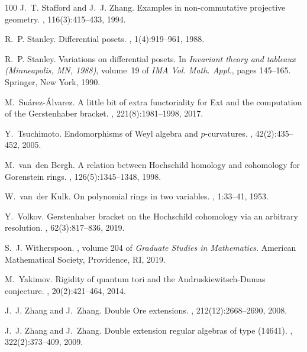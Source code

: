 \documentclass{commat}
\begin{document}
\begin{thebibliography}{100}
J.~T. Stafford and J.~J. Zhang.
\newblock Examples in non-commutative projective geometry.
, 116(3):415--433, 1994.

R.~P. Stanley.
\newblock Differential posets.
, 1(4):919--961, 1988.

R.~P. Stanley.
\newblock Variations on differential posets.
\newblock In {\em Invariant theory and tableaux ({M}inneapolis, {MN}, 1988)},
  volume~19 of {\em IMA Vol. Math. Appl.}, pages 145--165. Springer, New York,
  1990.

M.~Su\'arez-\'Alvarez.
\newblock A little bit of extra functoriality for {E}xt and the computation of
  the {G}erstenhaber bracket.
, 221(8):1981--1998, 2017.

Y.~Tsuchimoto.
\newblock Endomorphisms of {W}eyl algebra and {$p$}-curvatures.
, 42(2):435--452, 2005.

M.~van~den Bergh.
\newblock A relation between {H}ochschild homology and cohomology for
  {G}orenstein rings.
, 126(5):1345--1348, 1998.

W.~van~der Kulk.
\newblock On polynomial rings in two variables.
, 1:33--41, 1953.

Y.~Volkov.
\newblock Gerstenhaber bracket on the {H}ochschild cohomology via an arbitrary
  resolution.
, 62(3):817--836, 2019.

S.~J. Witherspoon.
, volume 204 of {\em Graduate
  Studies in Mathematics}.
\newblock American Mathematical Society, Providence, RI, 2019.

M.~Yakimov.
\newblock Rigidity of quantum tori and the {A}ndruskiewitsch-{D}umas
  conjecture.
, 20(2):421--464, 2014.

J.~J. Zhang and J.~Zhang.
\newblock Double {O}re extensions.
, 212(12):2668--2690, 2008.

J.~J. Zhang and J.~Zhang.
\newblock Double extension regular algebras of type (14641).
, 322(2):373--409, 2009.

\end{thebibliography}




\end{document}
